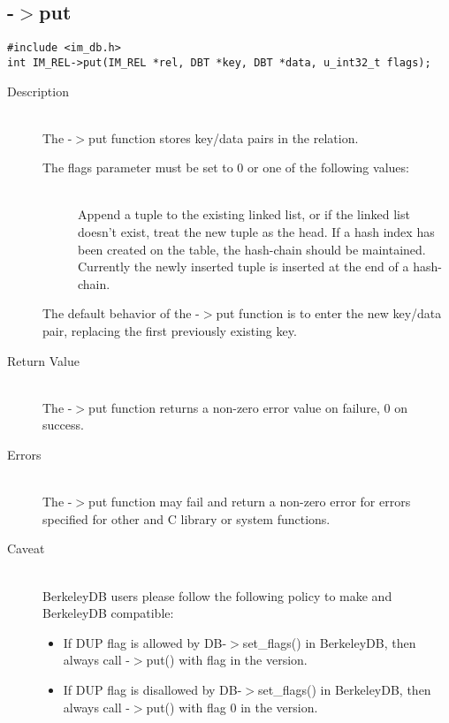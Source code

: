 \subsection{{\IMREL}-$>$put}
\begin{verbatim}
#include <im_db.h>
int IM_REL->put(IM_REL *rel, DBT *key, DBT *data, u_int32_t flags);
\end{verbatim}
\begin{description}
\item[Description]\ \\
  The {\IMREL}-$>$put function stores key/data pairs in the relation. 

  The flags parameter must be set to 0 or one of the following values: 
  \begin{description}
  \item[{\DBAPPEND}]\ \\
    Append a tuple to the existing linked list, or if the linked list
    doesn't exist, treat the new tuple as the head.  If a hash index
    has been created on the table, the hash-chain should be
    maintained.  Currently the newly inserted tuple is inserted at the
    end of a hash-chain.
  \end{description}

  The default behavior of the {\IMREL}-$>$put function is to enter the
  new key/data pair, replacing the first previously existing key.
\item[Return Value]\ \\
  The {\IMREL}-$>$put function returns a non-zero error value on
  failure, 0 on success.
\item[Errors]\ \\
  The {\IMREL}-$>$put function may fail and return a non-zero error
  for errors specified for other {\IMDB} and C library or system
  functions.
\item[Caveat]\ \\
  BerkeleyDB users please follow the following policy to make {\IMDB}
  and BerkeleyDB compatible:
  \begin{itemize}
  \item If DUP flag is allowed by DB-$>$set\_flags() in BerkeleyDB,
        then always call {\IMREL}-$>$put() with {\DBAPPEND} flag in
        the {\IMDB} version.
  \item If DUP flag is disallowed by DB-$>$set\_flags() in BerkeleyDB,
        then always call {\IMREL}-$>$put() with flag 0 in
        the {\IMDB} version.
  \end{itemize}
\end{description}

